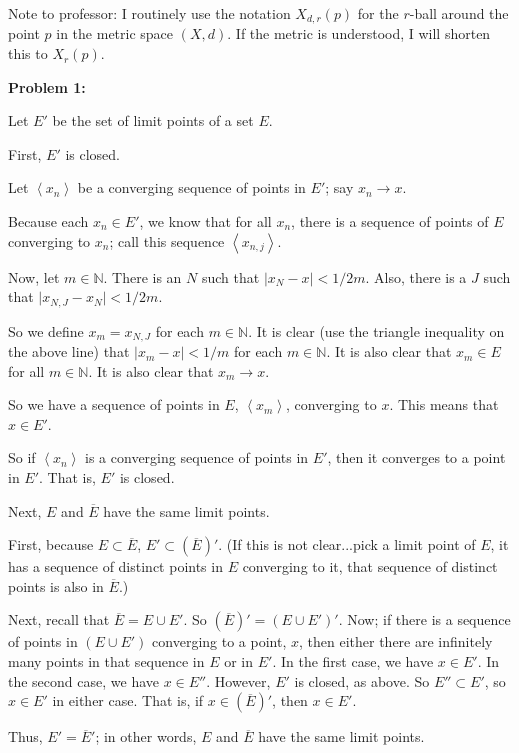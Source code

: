 \documentclass[a4paper,12pt]{article}
\newcommand{\tab}{\hspace{4mm}} %
\newcommand{\absval}[1]{\lvert #1 \rvert}
\newcommand{\anbrack}[1]{\left\langle #1 \right\rangle}
\newcommand{\N}{\mathbb{N}}
\begin{document}
Note to professor: I routinely use the notation $X_{d,r}(p)$ for the $r$-ball around the point $p$ in the metric space $(X,d)$. If the metric is understood, I will shorten this to $X_r(p)$.

{\bf Problem 1:}

Let $E'$ be the set of limit points of a set $E$.

First, $E'$ is closed.

\tab Let $\anbrack{x_n}$ be a converging sequence of points in $E'$; say $x_n \to x$.

\tab Because each $x_n \in E'$, we know that for all $x_n$, there is a sequence of points of $E$ converging to $x_n$; call this sequence $\anbrack{x_{n,j}}$. 

\tab Now, let $m \in \N$. There is an $N$ such that $\absval{x_N - x} < 1/2m$. Also, there is a $J$ such that $\absval{x_{N,J} - x_N} < 1/2m$.

\tab So we define $x_m = x_{N,J}$ for each $m \in \N$. It is clear (use the triangle inequality on the above line) that $\absval{x_m-x} < 1/m$ for each $m \in \N$. It is also clear that $x_m \in E$ for all $m \in \N$. It is also clear that $x_m \to x$.

\tab So we have a sequence of points in $E$, $\anbrack{x_m}$, converging to $x$. This means that $x \in E'$.

\tab So if $\anbrack{x_n}$ is a converging sequence of points in $E'$, then it converges to a point in $E'$. That is, $E'$ is closed.

Next, $E$ and $\overline{E}$ have the same limit points.

\tab First, because $E \subset \overline{E}$, $E' \subset (\overline{E})'$. (If this is not clear...pick a limit point of $E$, it has a sequence of distinct points in $E$ converging to it, that sequence of distinct points is also in $\overline{E}$.)

\tab Next, recall that $\overline{E} = E \cup E'$. So $(\overline{E})' = (E \cup E')'$. Now; if there is a sequence of points in $(E \cup E')$ converging to a point, $x$, then either there are infinitely many points in that sequence in $E$ or in $E'$. In the first case, we have $x \in E'$. In the second case, we have $x \in E''$. However, $E'$ is closed, as above. So $E'' \subset E'$, so $x \in E'$ in either case. That is, if $x \in (\overline{E})'$, then $x \in E'$.

Thus, $E' = \overline{E}'$; in other words, $E$ and $\overline{E}$ have the same limit points.
\end{document}
